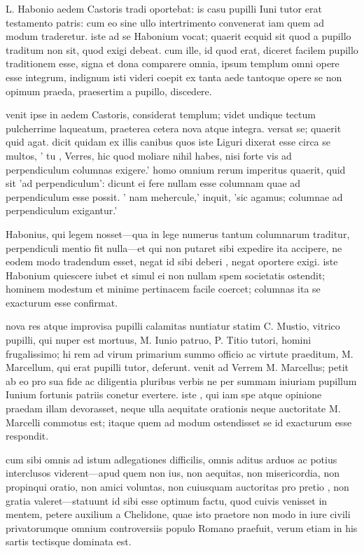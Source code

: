  L. Habonio aedem Castoris tradi oportebat: is casu pupilli Iuni tutor erat testamento patris: cum eo sine ullo intertrimento convenerat iam quem ad modum traderetur. iste ad se Habonium vocat; quaerit ecquid sit quod a pupillo traditum non sit, quod exigi debeat. cum ille, id quod erat, diceret facilem pupillo traditionem esse, signa et dona comparere omnia, ipsum templum omni opere esse integrum, indignum isti videri coepit ex tanta aede tantoque opere se non opimum praeda, praesertim a pupillo, discedere.

 venit ipse in aedem Castoris, considerat templum; videt undique tectum pulcherrime laqueatum, praeterea cetera nova atque integra. versat se; quaerit quid agat. dicit quidam ex illis canibus quos iste Liguri dixerat esse circa se multos, ' tu , Verres, hic quod moliare nihil habes, nisi forte vis ad perpendiculum columnas exigere.' homo omnium rerum imperitus quaerit, quid sit 'ad perpendiculum': dicunt ei fere nullam esse columnam quae ad perpendiculum esse possit. ' nam mehercule,' inquit, 'sic agamus; columnae ad perpendiculum exigantur.'

 Habonius, qui legem nosset—qua in lege numerus tantum columnarum traditur, perpendiculi mentio fit nulla—et qui non putaret sibi expedire ita accipere, ne eodem modo tradendum esset, negat id sibi deberi , negat oportere exigi. iste Habonium quiescere iubet et simul ei non nullam spem societatis ostendit; hominem modestum et minime pertinacem facile coercet; columnas ita se exacturum esse confirmat.

 nova res atque improvisa pupilli calamitas nuntiatur statim C. Mustio, vitrico pupilli, qui nuper est mortuus, M. Iunio patruo, P. Titio tutori, homini frugalissimo; hi rem ad virum primarium summo officio ac virtute praeditum, M. Marcellum, qui erat pupilli tutor, deferunt. venit ad Verrem M. Marcellus; petit ab eo pro sua fide ac diligentia pluribus verbis ne per summam iniuriam pupillum Iunium fortunis patriis conetur evertere. iste , qui iam spe atque opinione praedam illam devorasset, neque ulla aequitate orationis neque auctoritate M. Marcelli commotus est; itaque quem ad modum ostendisset se id exacturum esse respondit.

 cum sibi omnis ad istum adlegationes difficilis, omnis aditus arduos ac potius interclusos viderent—apud quem non ius, non aequitas, non misericordia, non propinqui oratio, non amici voluntas, non cuiusquam auctoritas pro pretio , non gratia valeret—statuunt id sibi esse optimum factu, quod cuivis venisset in mentem, petere auxilium a Chelidone, quae isto praetore non modo in iure civili privatorumque omnium controversiis populo Romano praefuit, verum etiam in his sartis tectisque dominata est.

